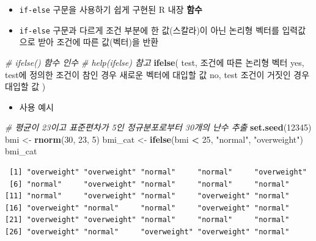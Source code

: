 \documentclass[
  11pt,
]{krantz}
\newenvironment{Shaded}{\begin{snugshade}}{\end{snugshade}}
\newcommand{\CommentTok}[1]{\textcolor[rgb]{0.37,0.37,0.37}{\textit{#1}}}
\newcommand{\DecValTok}[1]{\textcolor[rgb]{0.06,0.06,0.06}{#1}}
\newcommand{\KeywordTok}[1]{\textcolor[rgb]{0.27,0.27,0.27}{\textbf{#1}}}
\newcommand{\NormalTok}[1]{#1}
\newcommand{\OperatorTok}[1]{\textcolor[rgb]{0.43,0.43,0.43}{\textbf{#1}}}
\newcommand{\StringTok}[1]{\textcolor[rgb]{0.5,0.5,0.5}{#1}}
\providecommand{\tightlist}{%
  \setlength{\itemsep}{0pt}\setlength{\parskip}{0pt}}
\begin{document}
\begin{itemize}
\tightlist
\item
  \texttt{if-else} 구문을 사용하기 쉽게 구현된 R 내장 \textbf{함수}
\item
  \texttt{if-else} 구문과 다르게 조건 부분에 한 값(스칼라)이 아닌 논리형 벡터를 입력값으로 받아 조건에 따른 값(벡터)을 반환
\end{itemize}

\footnotesize

\begin{Shaded}
\begin{Highlighting}[]
\CommentTok{# ifelse() 함수 인수}
\CommentTok{# help(ifelse) 참고}
\KeywordTok{ifelse}\NormalTok{(}
\NormalTok{  test, 조건에 따른 논리형 벡터}
\NormalTok{  yes,  test에 정의한 조건이 참인 경우 새로운 벡터에 대입할 값}
\NormalTok{  no,   test 조건이 거짓인 경우 대입할 값}
\NormalTok{)}
\end{Highlighting}
\end{Shaded}

\normalsize

\begin{itemize}
\tightlist
\item
  사용 예시
\end{itemize}

\footnotesize

\begin{Shaded}
\begin{Highlighting}[]
\CommentTok{# 평균이 23이고 표준편차가 5인 정규분포로부터 30개의 난수 추출}
\KeywordTok{set.seed}\NormalTok{(}\DecValTok{12345}\NormalTok{)}
\NormalTok{bmi <-}\StringTok{ }\KeywordTok{rnorm}\NormalTok{(}\DecValTok{30}\NormalTok{, }\DecValTok{23}\NormalTok{, }\DecValTok{5}\NormalTok{) }
\NormalTok{bmi_cat <-}\StringTok{ }\KeywordTok{ifelse}\NormalTok{(bmi }\OperatorTok{<}\StringTok{ }\DecValTok{25}\NormalTok{, }\StringTok{"normal"}\NormalTok{, }\StringTok{"overweight"}\NormalTok{)}
\NormalTok{bmi_cat}
\end{Highlighting}
\end{Shaded}

\begin{verbatim}
 [1] "overweight" "overweight" "normal"     "normal"     "overweight"
 [6] "normal"     "overweight" "normal"     "normal"     "normal"    
[11] "normal"     "overweight" "normal"     "overweight" "normal"    
[16] "overweight" "normal"     "normal"     "overweight" "normal"    
[21] "overweight" "overweight" "normal"     "normal"     "normal"    
[26] "overweight" "normal"     "overweight" "overweight" "normal"    
\end{verbatim}
\end{document}
